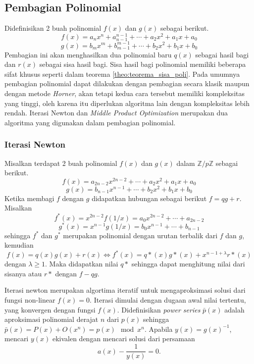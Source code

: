 \subsection{Pembagian Polinomial}
Didefinisikan 2 buah polinomial $f(x)$ dan $g(x)$ sebagai berikut.
$$ f(x) = a_n x^n + a_{n-1}^{n-1} + \cdots + a_2x^2 + a_1x + a_0 $$
$$ g(x) = b_m x^m + b_{m-1}^{m-1} + \cdots + b_2x^2 + b_1x + b_0 $$
Pembagian ini akan menghasilkan dua polinomial baru $ q(x) $ sebagai hasil bagi dan $ r(x) $ sebagai sisa hasil bagi. Sisa hasil bagi polinomial memiliki beberapa sifat khusus seperti dalam teorema \ref{theo:teorema_sisa_poli}.
Pada umumnya pembagian polinomial dapat dilakukan dengan pembagian secara klasik maupun dengan metode \textit{Horner}, akan tetapi kedua cara tersebut memiliki kompleksitas yang tinggi, oleh karena itu diperlukan algoritma lain dengan kompleksitas lebih rendah. Iterasi Newton dan \textit{Middle Product Optimization} merupakan dua algoritma yang digunakan dalam pembagian polinomial.

\subsubsection{Iterasi Newton}
\indent Misalkan terdapat 2 buah polinomial $f(x)$ dan $g(x)$ dalam $ \mathbb{Z}/p\mathbb{Z} $ sebagai berikut.
$$ f(x) = a_{2n-2} x^{2n-2} + \cdots + a_2x^2 + a_1x + a_0 $$
$$ g(x) = b_{n-1} x^{n-1} + \cdots + b_2x^2 + b_1x + b_0 $$
Ketika membagi $ f $ dengan $ g $ didapatkan hubungan sebagai berikut $ f = qg + r $.
Misalkan 
$$ f^*(x) = x^{2n-2}f(1/x) = a_0 x^{2n-2} + \cdots + a_{2n-2} $$
$$ g^*(x) = x^{n-1}g(1/x) = b_0 x^{n-1} + \cdots + b_{n-1} $$
sehingga $ f^* $ dan $ g^* $ merupakan polinomial dengan urutan terbalik dari $ f $ dan $ g $, kemudian
\begin{equation}
	f(x) = q(x)g(x) + r(x) \iff f^*(x) = q*(x) g*(x) + x^{n-1+\lambda} r*(x)
	\label{eq:persamaan_reversal}
\end{equation}
dengan $ \lambda \geq 1 $. Maka didapatkan nilai $ q* $ sehingga dapat menghitung nilai dari sisanya atau $ r* $ dengan $ f-qg $.

Iterasi newton merupakan algortima iteratif untuk mengaproksimasi solusi dari fungsi non-linear $ f(x) = 0 $. Iterasi dimulai dengan dugaan awal nilai tertentu, yang konvergen dengan fungsi $ f(x) $. 
Didefinisikan \textit{power series} $ \bar{p}(x) $ adalah aproksimasi polinomial derajat $ n $ dari $ p(x) $ sehingga $ \bar{p}(x) = P(x) + O(x^n) = p(x) \mod{x^n} $. 
Apabila $ y(x) = g(x)^{-1} $, mencari $ y(x) $ ekivalen dengan mencari solusi dari persamaan $$ a(x) - \frac{1}{y(x)} = 0. $$

